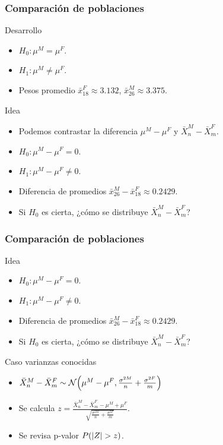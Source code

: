 \documentclass[table]{beamer}
\begin{document}
\begin{frame}
    \frametitle{Comparación de poblaciones}
    \begin{block}{Desarrollo}
        \begin{itemize}
            \item $H_{0}: \mu^{M} = \mu^{F}$.
            \item $H_{1}: \mu^{M} \neq \mu^{F}$.
            \item Pesos promedio $\bar{x}^{F}_{18} \approx 3.132$, $\bar{x}^{M}_{26} \approx 3.375$.
        \end{itemize}
    \end{block}
    \begin{block}{Idea}
        \begin{itemize}
            \item Podemos contrastar la diferencia $\mu^{M} - \mu^{F}$ y $\bar{X}^{M}_{n} - \bar{X}^{F}_{m}$.
            \item $H_{0}: \mu^{M} - \mu^{F} = 0$.
            \item $H_{1}: \mu^{M} - \mu^{F} \neq 0$.
            \item Diferencia de promedios $\bar{x}^{M}_{26} - \bar{x}^{F}_{18} \approx 0.2429$.
            \item Si $H_{0}$ es cierta, ¿cómo se distribuye $\bar{X}^{M}_{n} - \bar{X}^{F}_{m}$?
        \end{itemize}
    \end{block}
\end{frame}

\begin{frame}
    \frametitle{Comparación de poblaciones}
    \begin{block}{Idea}
        \begin{itemize}
            \item $H_{0}: \mu^{M} - \mu^{F} = 0$.
            \item $H_{1}: \mu^{M} - \mu^{F} \neq 0$.
            \item Diferencia de promedios $\bar{x}^{M}_{26} - \bar{x}^{F}_{18} \approx 0.2429$.
            \item Si $H_{0}$ es cierta, ¿cómo se distribuye $\bar{X}^{M}_{n} - \bar{X}^{F}_{m}$?
        \end{itemize}
    \end{block}
    \begin{block}{Caso varianzas conocidas}
        \begin{itemize}
            \item $\bar{X}^{M}_{n} - \bar{X}^{F}_{m} \sim \normal{\mu^{M} - \mu^{F}}{\frac{\sigma^{2 M}}{n} + \frac{\sigma^{2 F}}{m}}$
            \item Se calcula $z = \frac{\bar{X}^{M}_{n} - \bar{X}^{F}_{m} - \mu^{M} + \mu^{F}}{\sqrt{\frac{\sigma^{2 M}}{n} + \frac{\sigma^{2 F}}{m}}}$.
            \item Se revisa p-valor $\prob{\vparens{Z} > z}$.
        \end{itemize}
    \end{block}
\end{frame}
\end{document}
